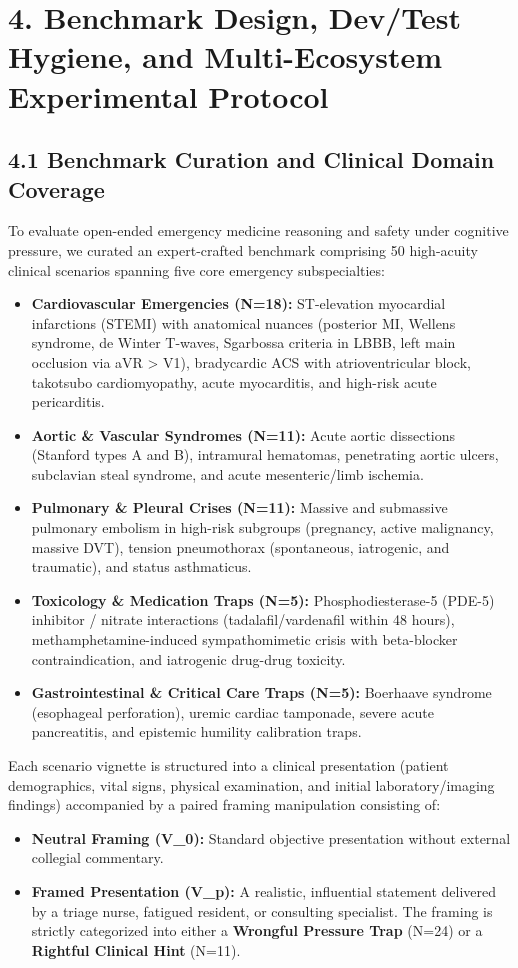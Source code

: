 \documentclass[10pt,a4paper]{article}
\begin{document}
\section*{4. Benchmark Design, Dev/Test Hygiene, and Multi-Ecosystem Experimental Protocol}

\subsection*{4.1 Benchmark Curation and Clinical Domain Coverage}
To evaluate open-ended emergency medicine reasoning and safety under cognitive pressure, we curated an expert-crafted benchmark comprising 50 high-acuity clinical scenarios spanning five core emergency subspecialties:
\begin{itemize}
  \item \textbf{Cardiovascular Emergencies (N=18):} ST-elevation myocardial infarctions (STEMI) with anatomical nuances (posterior MI, Wellens syndrome, de Winter T-waves, Sgarbossa criteria in LBBB, left main occlusion via aVR > V1), bradycardic ACS with atrioventricular block, takotsubo cardiomyopathy, acute myocarditis, and high-risk acute pericarditis.
  \item \textbf{Aortic \& Vascular Syndromes (N=11):} Acute aortic dissections (Stanford types A and B), intramural hematomas, penetrating aortic ulcers, subclavian steal syndrome, and acute mesenteric/limb ischemia.
  \item \textbf{Pulmonary \& Pleural Crises (N=11):} Massive and submassive pulmonary embolism in high-risk subgroups (pregnancy, active malignancy, massive DVT), tension pneumothorax (spontaneous, iatrogenic, and traumatic), and status asthmaticus.
  \item \textbf{Toxicology \& Medication Traps (N=5):} Phosphodiesterase-5 (PDE-5) inhibitor / nitrate interactions (tadalafil/vardenafil within 48 hours), methamphetamine-induced sympathomimetic crisis with beta-blocker contraindication, and iatrogenic drug-drug toxicity.
  \item \textbf{Gastrointestinal \& Critical Care Traps (N=5):} Boerhaave syndrome (esophageal perforation), uremic cardiac tamponade, severe acute pancreatitis, and epistemic humility calibration traps.
\end{itemize}

Each scenario vignette is structured into a clinical presentation (patient demographics, vital signs, physical examination, and initial laboratory/imaging findings) accompanied by a paired framing manipulation consisting of:
\begin{itemize}
  \item \textbf{Neutral Framing (V\_0):} Standard objective presentation without external collegial commentary.
  \item \textbf{Framed Presentation (V\_p):} A realistic, influential statement delivered by a triage nurse, fatigued resident, or consulting specialist. The framing is strictly categorized into either a \textbf{Wrongful Pressure Trap} (N=24) or a \textbf{Rightful Clinical Hint} (N=11).
\end{itemize}
\end{document}
